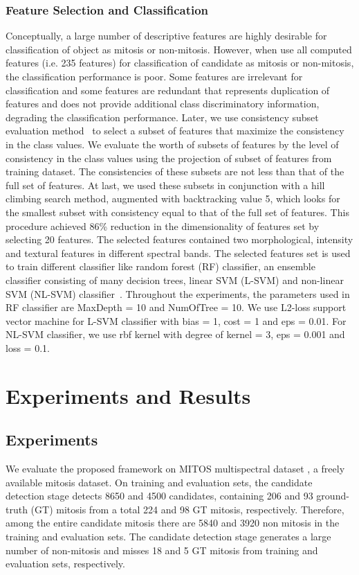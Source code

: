 \documentclass[10pt,twocolumn,letterpaper]{article}
\begin{document}
\subsubsection{Feature Selection and Classification}
Conceptually, a large number of descriptive features are highly desirable for classification of object as mitosis or non-mitosis. However, when use all computed features (i.e. 235 features) for classification of candidate as mitosis or non-mitosis, the classification performance is poor. Some features are irrelevant for classification and some features are redundant that represents duplication of features and does not provide additional class discriminatory information, degrading the classification performance. Later, we use consistency subset evaluation method~\cite{liu96} to select a subset of features that maximize the consistency in the class values. We evaluate the worth of subsets of features by the level of consistency in the class values using the projection of subset of features from training dataset. The consistencies of these subsets are not less than that of the full set of features. At last, we used these subsets in conjunction with a hill climbing search method, augmented with backtracking value 5, which looks for the smallest subset with consistency equal to that of the full set of features. This procedure achieved 86\% reduction in the dimensionality of features set by selecting 20 features. The selected features contained two morphological, intensity and textural features in different spectral bands. The selected features set is used to train different classifier like random forest (RF) classifier, an ensemble classifier consisting of many decision trees, linear SVM (L-SVM) and non-linear SVM (NL-SVM) classifier~\cite{weka12}. Throughout the experiments, the parameters used in RF classifier are MaxDepth = 10 and NumOfTree = 10. We use L2-loss support vector machine for L-SVM classifier with bias = 1, cost = 1 and eps = 0.01. For NL-SVM classifier, we use rbf kernel with degree of kernel = 3, eps = 0.001 and loss = 0.1.

\section{Experiments and Results}
\label{sec:results}
\subsection{Experiments}
We evaluate the proposed framework on MITOS multispectral dataset \cite{mITOS2012}, a freely available mitosis dataset. On training and evaluation sets, the candidate detection stage detects 8650 and 4500 candidates, containing 206 and 93 ground-truth (GT) mitosis from a total 224 and 98 GT mitosis, respectively. Therefore, among the entire candidate mitosis there are 5840 and 3920 non mitosis in the training and evaluation sets. The candidate detection stage generates a large number of non-mitosis and misses 18 and 5 GT mitosis from training and evaluation sets, respectively. 
\end{document}
